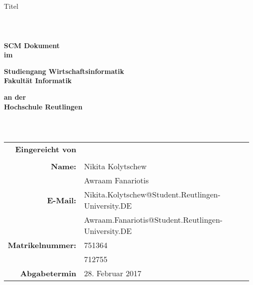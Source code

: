 \thispagestyle{empty}


\begin{figure}[t]
  \centering
\end{figure}

\begin{verbatim}


\end{verbatim}

\begin{center}
  \Large{Titel}
\end{center}

\begin{verbatim}



\end{verbatim}

\begin{center}
  \doublespacing
  \textbf{\LARGE{SCM Dokument}} \\
  \textbf{\small{im}}

  \singlespacing
  \textbf{Studiengang Wirtschaftsinformatik} \\
  \textbf{Fakultät Informatik}

  \doublespacing
  \textbf{\small{an der}} \\
  \textbf{Hochschule Reutlingen}
\end{center}

\begin{verbatim}



\end{verbatim}

\begin{center}
  \begin{tabular}{rll}
    \textbf{Eingereicht von} & & \\ \\
    \textbf{Name:} & Nikita Kolytschew & \\
							     & Awraam Fanariotis & \\
    \textbf{E-Mail:} & Nikita.Kolytschew@Student.Reutlingen-University.DE & \\
								     & Awraam.Fanariotis@Student.Reutlingen-University.DE & \\
    \textbf{Matrikelnummer:} & 751364 & \\
														 & 712755 & \\
    
	  \textbf{Abgabetermin} & 28. Februar 2017 & \\
  \end{tabular}
\end{center}